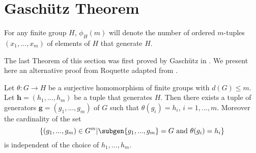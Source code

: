 \section{Gaschütz Theorem}

\begin{definition}
    For any finite group $H$, $\phi_H(m)$ will denote the number of ordered $m$-tuples $(x_1,...,x_m)$ of elements of $H$ that generate $H$.
\end{definition}

The last Theorem of this section was first proved by Gaschütz in \cite{GaschützZENGP}. We present here an alternative proof from Roquette adapted from \cite[p.~360]{FriedFA}.

\begin{theorem}
    \label{S1:GT}
    Let $\theta : G \rightarrow H$ be a surjective homomorphism of finite groups with $d(G) \le m$. 
    Let $\mathbf{h} = (h_1, ..., h_m)$ be a tuple that generates $H$.
    Then there exists a tuple of generators $\mathbf{g}=(g_1, ..., g_m)$ of $G$ such that $\theta(g_i) = h_i$, $i = 1,...,m$.
    Moreover the cardinality of the set $$\left\{(g_1,...,g_m) \in G^m |\subgen{g_1,...,g_m} = G \text{ and } \theta(g_i) = h_i \right\}$$ is independent of the choice of $h_1, ..., h_m$.
\end{theorem}

